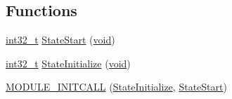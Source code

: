 \subsection*{Functions}
\begin{DoxyCompactItemize}
\item 
\hyperlink{group___n_a_m_e_gafd12020da5a235dfcf0c3c748fb5baed}{int32\-\_\-t} \hyperlink{group___state_ga9b5b60f1575dfa72f03b42b503e9095c}{State\-Start} (\hyperlink{group___n_a_m_e_ga18028b8badbf1ea7e704ccac3c488e82}{void})
\item 
\hyperlink{group___n_a_m_e_gafd12020da5a235dfcf0c3c748fb5baed}{int32\-\_\-t} \hyperlink{group___state_gad59daafb348cfa8a33ce1d08eb2f8e5b}{State\-Initialize} (\hyperlink{group___n_a_m_e_ga18028b8badbf1ea7e704ccac3c488e82}{void})
\item 
\hyperlink{group___state_gac687f4ea48d6390c8854b0a5a1250752}{M\-O\-D\-U\-L\-E\-\_\-\-I\-N\-I\-T\-C\-A\-L\-L} (\hyperlink{group___state_gad59daafb348cfa8a33ce1d08eb2f8e5b}{State\-Initialize}, \hyperlink{group___state_ga9b5b60f1575dfa72f03b42b503e9095c}{State\-Start})
\end{DoxyCompactItemize}
